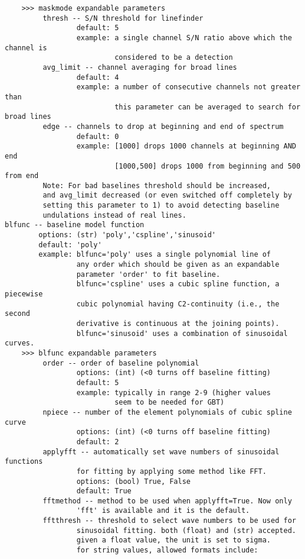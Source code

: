 \begin{verbatim}
    >>> maskmode expandable parameters
         thresh -- S/N threshold for linefinder
                 default: 5
                 example: a single channel S/N ratio above which the channel is
                          considered to be a detection
         avg_limit -- channel averaging for broad lines
                 default: 4
                 example: a number of consecutive channels not greater than
                          this parameter can be averaged to search for broad lines
         edge -- channels to drop at beginning and end of spectrum
                 default: 0
                 example: [1000] drops 1000 channels at beginning AND end
                          [1000,500] drops 1000 from beginning and 500 from end
         Note: For bad baselines threshold should be increased,
         and avg_limit decreased (or even switched off completely by
         setting this parameter to 1) to avoid detecting baseline
         undulations instead of real lines.
blfunc -- baseline model function
        options: (str) 'poly','cspline','sinusoid'
        default: 'poly'
        example: blfunc='poly' uses a single polynomial line of 
                 any order which should be given as an expandable 
                 parameter 'order' to fit baseline. 
                 blfunc='cspline' uses a cubic spline function, a piecewise 
                 cubic polynomial having C2-continuity (i.e., the second 
                 derivative is continuous at the joining points). 
                 blfunc='sinusoid' uses a combination of sinusoidal curves. 
    >>> blfunc expandable parameters
         order -- order of baseline polynomial
                 options: (int) (<0 turns off baseline fitting)
                 default: 5
                 example: typically in range 2-9 (higher values
                          seem to be needed for GBT)
         npiece -- number of the element polynomials of cubic spline curve
                 options: (int) (<0 turns off baseline fitting)
                 default: 2
         applyfft -- automatically set wave numbers of sinusoidal functions 
                 for fitting by applying some method like FFT.
                 options: (bool) True, False
                 default: True
         fftmethod -- method to be used when applyfft=True. Now only 
                 'fft' is available and it is the default.
         fftthresh -- threshold to select wave numbers to be used for 
                 sinusoidal fitting. both (float) and (str) accepted.
                 given a float value, the unit is set to sigma.
                 for string values, allowed formats include:

\end{verbatim}
